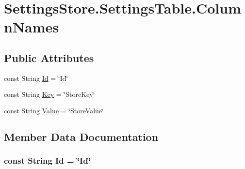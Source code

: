 \hypertarget{classOTA_1_1Data_1_1SettingsStore_1_1SettingsTable_1_1ColumnNames}{}\section{Settings\+Store.\+Settings\+Table.\+Column\+Names}
\label{classOTA_1_1Data_1_1SettingsStore_1_1SettingsTable_1_1ColumnNames}
\subsection*{Public Attributes}
\begin{DoxyCompactItemize}
\item 
const String \hyperlink{classOTA_1_1Data_1_1SettingsStore_1_1SettingsTable_1_1ColumnNames_a2d48f49977fe14e69c0785f2574f8b1b}{Id} = \char`\"{}Id\char`\"{}
\item 
const String \hyperlink{classOTA_1_1Data_1_1SettingsStore_1_1SettingsTable_1_1ColumnNames_a921b4f51b4d5db174ecb9f947b96619b}{Key} = \char`\"{}Store\+Key\char`\"{}
\item 
const String \hyperlink{classOTA_1_1Data_1_1SettingsStore_1_1SettingsTable_1_1ColumnNames_ae064bda3fea88be839f0e1b310c4ee5a}{Value} = \char`\"{}Store\+Value\char`\"{}
\end{DoxyCompactItemize}


\subsection{Member Data Documentation}
\hypertarget{classOTA_1_1Data_1_1SettingsStore_1_1SettingsTable_1_1ColumnNames_a2d48f49977fe14e69c0785f2574f8b1b}{}
\subsubsection[{Id}]{\setlength{\rightskip}{0pt plus 5cm}const String Id = \char`\"{}Id\char`\"{}}\label{classOTA_1_1Data_1_1SettingsStore_1_1SettingsTable_1_1ColumnNames_a2d48f49977fe14e69c0785f2574f8b1b}
\hypertarget{classOTA_1_1Data_1_1SettingsStore_1_1SettingsTable_1_1ColumnNames_a921b4f51b4d5db174ecb9f947b96619b}{}

